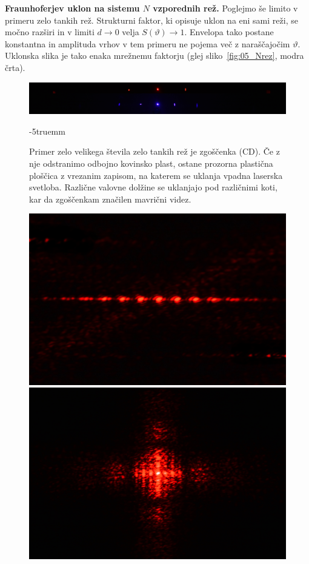 \begin{example}{\bf Fraunhoferjev uklon na sistemu $N$ vzporednih rež.}
Poglejmo še limito v primeru zelo tankih rež. Strukturni faktor, ki opisuje uklon na 
eni sami reži, se močno razširi in v limiti $d\to 0$ velja $S(\vartheta) \to 1$. Envelopa
tako postane konstantna in amplituda vrhov v tem primeru ne pojema več z naraščajočim 
$\vartheta$. Uklonska slika je tako enaka mrežnemu faktorju (glej sliko~\ref{fig:05_Nrez}, modra črta).
\begin{figure}[ht]
\centering
\includegraphics[width=140truemm]{slike/05_photos_CD.JPG}
\caption{Primer zelo velikega števila zelo tankih rež je zgoščenka (CD). Če z nje odstranimo
odbojno kovinsko plast, ostane prozorna plastična ploščica z vrezanim zapisom, na katerem se uklanja 
vpadna laserska svetloba. Različne valovne dolžine se uklanjajo pod različnimi koti, kar
da zgoščenkam značilen mavrični videz.}
\label{fig:05_uklon_cd}
\vglue-5truemm
\end{figure}
\begin{figure}[ht]
\centering
\includegraphics[width=70truemm]{slike/05_photos_perje.jpg}\hfill
\includegraphics[width=70truemm]{slike/05_photos_ruta.jpg}

\end{figure}
\end{example}
